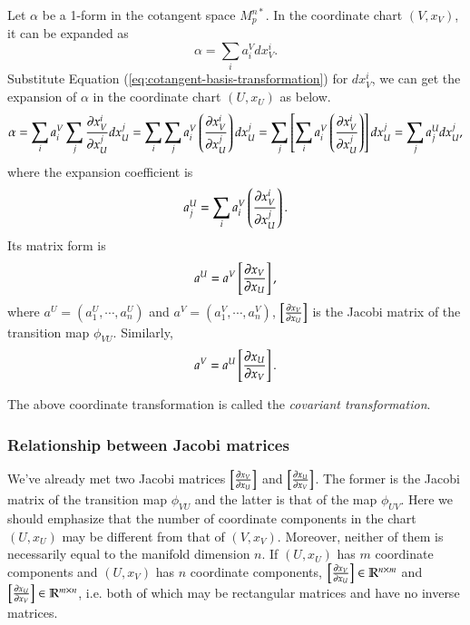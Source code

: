 \documentclass[11pt, a4paper]{book}
\begin{document}
Let $\alpha$ be a 1-form in the cotangent space $M_p^{n*}$. In the coordinate chart
$(V,x_V)$, it can be expanded as
\begin{equation*}
  \alpha = \sum_i a_i^V dx_V^i.
\end{equation*}
Substitute Equation (\ref{eq:cotangent-basis-transformation}) for $dx_V^i$, we can get the
expansion of $\alpha$ in the coordinate chart $(U,x_U)$ as below.
\begin{equation*}
  \alpha = \sum_i a_i^V \sum_j \frac{\partial x_V^i}{\partial x_U^j} dx_U^j = \sum_i\sum_j
  a_i^V \left( \frac{\partial x_V^i}{\partial x_U^j} \right) dx_U^j = \sum_j \left[ \sum_i
    a_i^V \left( \frac{\partial x_V^i}{\partial x_U^j} \right) \right] dx_U^j = \sum_j a_j^U dx_U^j,
\end{equation*}
where the expansion coefficient is
\begin{equation*}
  \label{eq:covector-transformation}
  a_j^U = \sum_i a_i^V \left( \frac{\partial x_V^i}{\partial x_U^j} \right).
\end{equation*}
Its matrix form is
\begin{equation}
  a^U = a^V \left[ \frac{\partial x_V}{\partial x_U} \right],
\end{equation}
where $a^U = (a_1^U,\cdots,a_n^U)$ and $a^V = (a_1^V,\cdots,a_n^V)$,
$\left[ \frac{\partial x_V}{\partial x_U} \right]$ is the Jacobi matrix of the transition map
$\phi_{VU}$. Similarly,
\begin{equation}
a^V = a^U \left[ \frac{\partial x_U}{\partial x_V} \right].
\end{equation}

The above coordinate transformation is called the \emph{covariant transformation}.

\subsubsection{Relationship between Jacobi matrices}

We've already met two Jacobi matrices $\left[ \frac{\partial x_V}{\partial x_U} \right]$ and
$\left[ \frac{\partial x_U}{\partial x_V} \right]$. The former is the Jacobi matrix of the
transition map $\phi_{VU}$ and the latter is that of the map $\phi_{UV}$. Here we should
emphasize that the number of coordinate components in the chart $(U,x_U)$ may be different
from that of $(V,x_V)$. Moreover, neither of them is necessarily equal to the manifold
dimension $n$. If $(U,x_U)$ has $m$ coordinate components and $(U,x_V)$ has $n$ coordinate
components, $\left[ \frac{\partial x_V}{\partial x_U} \right] \in \mathbb{R}^{n\times m}$ and
$\left[ \frac{\partial x_U}{\partial x_V} \right]\in \mathbb{R}^{m\times n}$, i.e. both of
which may be rectangular matrices and have no inverse matrices.
\end{document}
